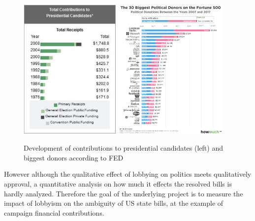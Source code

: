 \documentclass{custom_report}
\begin{document}
\begin{figure}[h!]
\begin{center}
\includegraphics[height=7cm]{images/us_presidential_contribs_over_years.png}
\includegraphics[height=7cm]{images/trump_vs_hillary_donors.png}
\end{center}
\caption{Development of contributions to presidential candidates (left) and biggest donors according to FED}
\label{fig:us_presidential}
\end{figure}

However although the qualitative effect of lobbying on politics meets qualitatively approval, a quantitative analysis on how much it effects the resolved bills is hardly analyzed. Therefore the goal of the underlying project is to measure the impact of lobbyism on the ambiguity of US state bills, at the example of campaign financial contributions.

\end{document}
